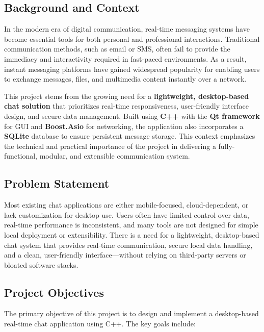 \documentclass[12pt,a4paper]{article}
\begin{document}
\subsection{Background and Context}
In the modern era of digital communication, real-time messaging systems have become essential tools for both personal and professional interactions. Traditional communication methods, such as email or SMS, often fail to provide the immediacy and interactivity required in fast-paced environments. As a result, instant messaging platforms have gained widespread popularity for enabling users to exchange messages, files, and multimedia content instantly over a network.

This project stems from the growing need for a \textbf{lightweight, desktop-based chat solution} that prioritizes real-time responsiveness, user-friendly interface design, and secure data management. Built using \textbf{C++} with the \textbf{Qt framework} for GUI and \textbf{Boost.Asio} for networking, the application also incorporates a \textbf{SQLite} database to ensure persistent message storage. This context emphasizes the technical and practical importance of the project in delivering a fully-functional, modular, and extensible communication system.

\subsection{Problem Statement}
Most existing chat applications are either mobile-focused, cloud-dependent, or lack customization for desktop use. Users often have limited control over data, real-time performance is inconsistent, and many tools are not designed for simple local deployment or extensibility. There is a need for a lightweight, desktop-based chat system that provides real-time communication, secure local data handling, and a clean, user-friendly interface—without relying on third-party servers or bloated software stacks.
\subsection{Project Objectives}
The primary objective of this project is to design and implement a desktop-based real-time chat application using C++. The key goals include:
\end{document}
